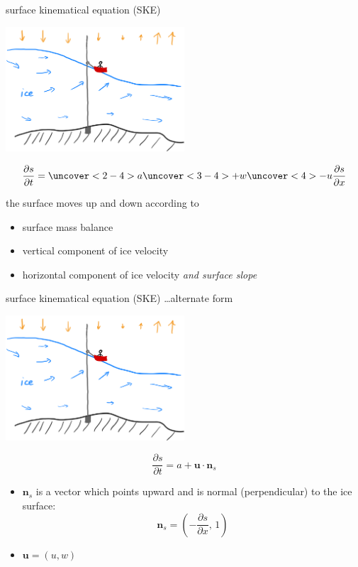 \documentclass[10pt,dvipsnames]{beamer}
\newcommand{\bn}{\mathbf{n}}
\newcommand{\bu}{\mathbf{u}}
\begin{document}
\begin{frame}{surface kinematical equation (SKE)}
\begin{center}
\includegraphics[width=0.5\textwidth]{boatplus}
\end{center}

\vspace{-5mm}
\begin{equation*}
\frac{\partial s}{\partial t} = \uncover<2-4>{a} \uncover<3-4>{+w} \uncover<4>{-u \frac{\partial s}{\partial x}}
\end{equation*}

the surface moves up and down according to
\begin{itemize}
\item<2-4> surface mass balance
\item<3-4> vertical component of ice velocity
\item<4> horizontal component of ice velocity \emph{and surface slope}
\end{itemize}
\end{frame}

\begin{frame}{surface kinematical equation (SKE) \dots alternate form}
\begin{center}
\includegraphics[width=0.5\textwidth]{boatplus}
\end{center}

\vspace{-5mm}
\begin{equation*}
\frac{\partial s}{\partial t} = a + \bu \cdot \bn_s
\end{equation*}

\begin{itemize}
\item $\bn_s$ is a vector which points upward and is normal (perpendicular) to the ice surface:
	$$\bn_s = \left(-\frac{\partial s}{\partial x}, \,1\right)$$
\item $\bu=(u,w)$
\end{itemize}
\end{frame}
\end{document}
